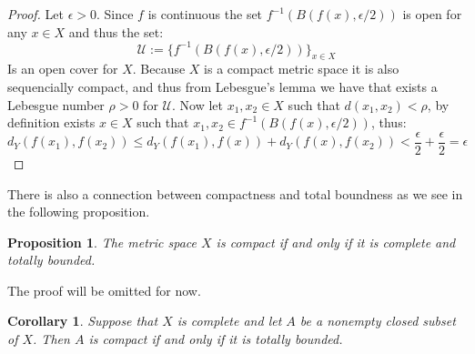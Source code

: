 \documentclass[11pt,a4paper]{article}
\theoremstyle{definition}
\theoremstyle{plain}
\newtheorem{proposition}[theorem]{Proposition}
\newtheorem{corollary}[theorem]{Corollary}
\begin{document}
  \begin{proof}
    Let $\epsilon > 0$. Since $f$ is continuous the set 
    $f^{-1}(B(f(x),\epsilon/2))$ is open for any $x \in X$ and thus
    the set:
    \[
      \mathcal{U} := \{f^{-1}(B(f(x),\epsilon/2))\}_{x \in X}
    \]
    Is an open cover for $X$. Because $X$ is a compact metric space
    it is also sequencially compact, and thus from Lebesgue's lemma
    we have that exists a Lebesgue number $\rho > 0$ for $\mathcal{U}$.
    Now let $x_1,x_2 \in X$ such that $d(x_1,x_2) < \rho$, by definition
    exists $x \in X$ such that $x_1,x_2 \in f^{-1}(B(f(x),\epsilon/2))$,
    thus:
    \[
      d_Y(f(x_1),f(x_2)) \le d_Y(f(x_1),f(x)) + d_Y(f(x),f(x_2)) <
      \frac{\epsilon}{2} + \frac{\epsilon}{2} = \epsilon
    \]
  \end{proof}
  There is also a connection between compactness and total boundness as
  we see in the following proposition.
  \begin{proposition}
    The metric space $X$ is compact if and only if it is complete
    and totally bounded.
  \end{proposition}
  The proof will be omitted for now.
  \begin{corollary}
    Suppose that $X$ is complete and let $A$ be a nonempty closed subset
    of $X$. Then $A$ is compact if and only if it is totally bounded.
  \end{corollary}

  \newpage
\end{document}
